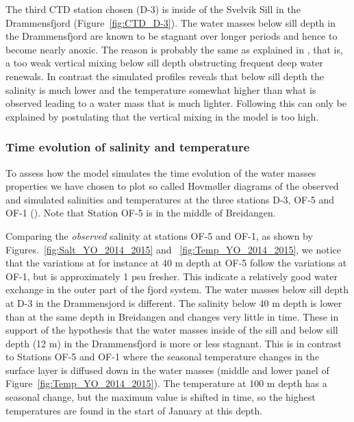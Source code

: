 The third CTD station chosen (D-3) is inside of the Svelvik Sill in the Drammensfjord (Figure~\ref{fig:CTD_D-3}). The water masses below sill depth in the Drammensfjord are known to be stagnant over longer periods and hence to become nearly anoxic. The reason is probably the same as explained in \cite{staal:roed:2016}, that is, a too weak vertical mixing below sill depth obstructing frequent deep water renewals. In contrast the simulated profiles reveals that below sill depth the salinity is much lower and the temperature somewhat higher than what is observed leading to a water mass that is much lighter. Following \cite{staal:roed:2016} this can only be explained by postulating that the vertical mixing in the model is too high.  


\clearpage
\subsubsection{Time evolution of salinity and temperature}
\label{subsubsec:evolu}
To assess how the model simulates the time evolution of the water masses properties we have chosen to plot so called Hovm{\o}ller diagrams of the observed and simulated salinities and temperatures at the three stations D-3, OF-5 and OF-1 (). Note that Station OF-5 is in the middle of Breidangen. 

Comparing the \emph{observed} salinity at stations OF-5 and OF-1, as shown by Figures.~\ref{fig:Salt_YO_2014_2015} and ~\ref{fig:Temp_YO_2014_2015}, we notice that the variations at for instance at 40 m depth at OF-5 follow the variations at OF-1, but is approximately 1 psu fresher. This indicate a relatively good water exchange in the outer part of the fjord system. The water masses below sill depth at D-3 in the Drammensjord is different. The salinity below 40 m depth is lower than at the same depth in Breidangen and changes very little in time. These in support of the hypothesis that the water masses inside of the sill and below sill depth (12 m) in the Drammensfjord is more or less stagnant. This is in contrast to Stations OF-5 and OF-1 where the seasonal temperature changes in the surface layer is diffused down in the water masses (middle and lower panel of Figure~\ref{fig:Temp_YO_2014_2015}). The temperature at 100 m depth has a seasonal change, but the maximum value is shifted in time, so the highest temperatures are found in the start of January at this depth.



